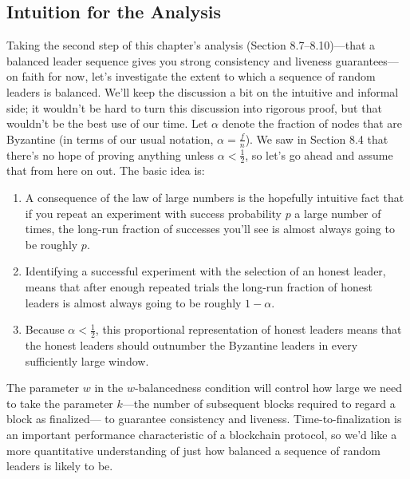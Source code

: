 \subsection{Intuition for the Analysis}
Taking the second step of this chapter’s analysis (Section 8.7–8.10)—that a balanced leader
sequence gives you strong consistency and liveness guarantees—on faith for now, let’s investigate the extent to which a sequence of random leaders is balanced. We’ll keep the discussion
a bit on the intuitive and informal side; it wouldn't be hard to turn this discussion into 
rigorous proof, but that wouldn't be the best use of our time.
Let $\alpha$ denote the fraction of nodes that are Byzantine (in terms of our usual notation,
$\alpha = \frac{f}{n}$). We saw in Section 8.4 that there’s no hope of proving anything unless $\alpha < \frac{1}{2}$, so
let’s go ahead and assume that from here on out. The basic idea is:
\begin{enumerate}
    \item A consequence of the law of large numbers is the hopefully intuitive fact that if you
repeat an experiment with success probability $p$ a large number of times, the long-run
fraction of successes you’ll see is almost always going to be roughly $p$.
    \item Identifying a successful experiment with the selection of an honest leader, means
that after enough repeated trials the long-run fraction of honest leaders is almost always
going to be roughly $1 - \alpha$.
    \item Because $\alpha < \frac{1}{2}$, this proportional representation of honest leaders means that the honest
leaders should outnumber the Byzantine leaders in every sufficiently large window.
\end{enumerate}
The parameter $w$ in the $w$-balancedness condition will control how large we need to take
the parameter $k$—the number of subsequent blocks required to regard a block as finalized—
to guarantee consistency and liveness. Time-to-finalization is an important performance
characteristic of a blockchain protocol, so we’d like a more quantitative understanding of
just how balanced a sequence of random leaders is likely to be.\\


